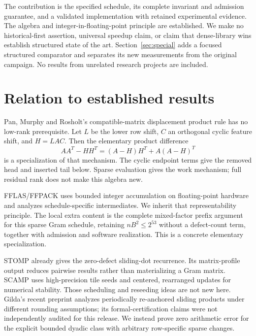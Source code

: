\documentclass[10pt,a4paper]{article}
\begin{document}
The contribution is the specified schedule, its complete invariant and
admission guarantee, and a validated implementation with retained experimental
evidence. The algebra and integer-in-floating-point principle are established.
We make no historical-first assertion, universal speedup claim, or claim that
dense-library wins establish structured state of the art. Section~\ref{sec:special}
adds a focused structured comparator and separates its new measurements from
the original campaign. No results from unrelated research projects are included.

\section{Relation to established results}\label{sec:related}
Pan, Murphy and Rosholt's compatible-matrix displacement product rule
\cite[Section 2.4, Theorem 2.3]{pan2008} has no low-rank prerequisite.
Let $L$ be the lower row shift, $C$ an orthogonal cyclic feature shift, and
$H=LAC$. Then the elementary product difference
\begin{equation}\label{eq:product}
 AA^T-HH^T=(A-H)H^T+A(A-H)^T
\end{equation}
is a specialization of that mechanism. The cyclic endpoint terms give the
removed head and inserted tail below. Sparse evaluation gives the work
mechanism; full residual rank does not make this algebra new.

FFLAS/FFPACK \cite[Sections 2.1.2 and 3.2.3]{fflas} uses bounded integer
accumulation on floating-point hardware and analyzes schedule-specific
intermediates. We inherit that representability principle. The local extra
content is the complete mixed-factor prefix argument for this sparse Gram
schedule, retaining $nB^2\le2^{53}$ without a defect-count term, together with
admission and software realization. This is a concrete elementary specialization.

STOMP \cite[Section IV-A, Equation (4)]{stomp} already gives the zero-defect
sliding-dot recurrence. Its matrix-profile output reduces pairwise results
rather than materializing a Gram matrix. SCAMP \cite[Sections 3.2.4 and 3.3]{scamp}
uses high-precision tile seeds and centered, rearranged updates for numerical
stability. Those scheduling and reseeding ideas are not new here. Gilda's
recent preprint \cite{gilda} analyzes periodically re-anchored sliding products
under different rounding assumptions; its formal-certification claims were not
independently audited for this release. We instead prove zero arithmetic error
for the explicit bounded dyadic class with arbitrary row-specific sparse changes.
\end{document}
